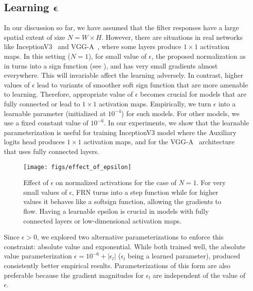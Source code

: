 \documentclass[10pt,twocolumn,letterpaper]{article}
\newcommand{\momentnorm}{FRN}
\begin{document}
\subsection{Learning $\bm{\epsilon}$}
\label{sec:learned_eps}

In our discussion so far, we have assumed that the filter responses have a large spatial extent of size $N = W{\times}H$. However, there are situations in real networks like InceptionV3~\cite{inceptionv3} and VGG-A~\cite{vggnet}, where some layers produce $1 \times 1$ activation maps. In this setting ($N{=}1$), for small value of $\epsilon$, the proposed normalization as in  turns into a sign function (see ), and has very small gradients almost everywhere. This will invariable affect the learning adversely. In contrast, higher values of $\epsilon$ lead to variants of smoother soft sign function that are more amenable to learning. Therefore, appropriate value of $\epsilon$ becomes crucial for models that are fully connected or lead to $1{\times}1$ activation maps. Empirically, we turn $\epsilon$ into a learnable parameter (initialized at $10^{-4}$) for such models. For other models, we use a fixed constant value of $10^{-6}$. In our experiments, we show that the learnable parameterization is useful for training InceptionV3 model where the Auxiliary logits head produces $1{\times}1$ activation maps, and for the VGG-A~\cite{vggnet} architecture that uses fully connected layers.

\begin{figure}[t]
\begin{center}
   \texttt{[image: figs/effect\_of\_epsilon]}
\end{center}
\vspace{-0.6cm}
   \caption{Effect of $\epsilon$ on normalized activations for the case of $N=1$. For very small values of $\epsilon$, \momentnorm{} turns into a step function while for higher values it behaves like a softsign function, allowing the gradients to flow. Having a learnable epsilon is crucial in models with fully connected layers or low-dimensional activation maps.}
\label{fig:lambdaeffect}
\vspace{-0.4cm}
\end{figure}


\medskip
\noindent
Since $\epsilon > 0$, we explored two alternative parameterizations to enforce this constraint: absolute value and exponential. While both trained well, the absolute value parameterization $\epsilon{=}10^{-6}{+}|\epsilon_l|$ ($\epsilon_l$ being a learned parameter), produced consistently better empirical results. Parameterizations of this form are also preferable because the gradient magnitudes for $\epsilon_l$ are independent of the value of $\epsilon$.
\end{document}
